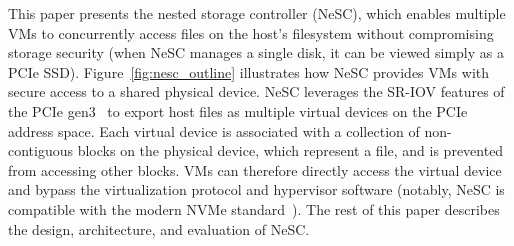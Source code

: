 This paper presents the nested storage controller (NeSC), which enables multiple VMs to concurrently access files on the host's filesystem without compromising storage security (when NeSC manages a single disk, it can be viewed simply as a PCIe SSD).
Figure~\ref{fig:nesc_outline} illustrates how NeSC provides VMs with secure access to a shared physical device.
NeSC leverages the SR-IOV features of the PCIe gen3~\cite{pcisigiov} to export host files as multiple virtual devices on the PCIe address space. Each virtual device is associated with a collection of non-contiguous blocks on the physical device, which represent a file, and is  prevented from accessing other blocks. VMs can therefore directly access the virtual device and bypass the virtualization protocol and hypervisor software (notably, NeSC is compatible with the modern NVMe standard~\cite{nvme}).
The rest of this paper describes the design, architecture, and evaluation of NeSC.












